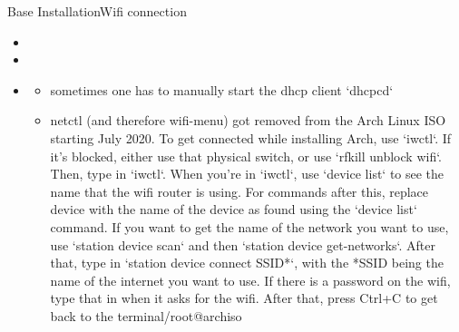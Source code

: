 \begin{frame}[fragile]{Base Installation}{Wifi connection}
  \begin{itemize}
    \item {}
    \item {}
    \item {}
    \begin{Sidenote}
      \begin{itemize}
        \item sometimes one has to manually start the dhcp client `dhcpcd`
        \item netctl (and therefore wifi-menu) got removed from the Arch Linux ISO starting July 2020. To get connected while installing Arch, use `iwctl`. If it's blocked, either use that physical switch, or use `rfkill unblock wifi`. Then, type in `iwctl`. When you're in `iwctl`, use `device list` to see the name that the wifi router is using. For commands after this, replace device with the name of the device as found using the `device list` command. If you want to get the name of the network you want to use, use `station device scan` and then `station device get-networks`. After that, type in `station device connect SSID*`, with the *SSID being the name of the internet you want to use. If there is a password on the wifi, type that in when it asks for the wifi. After that, press Ctrl+C to get back to the terminal/root@archiso
      \end{itemize}
    \end{Sidenote}
  \end{itemize}
\end{frame}
